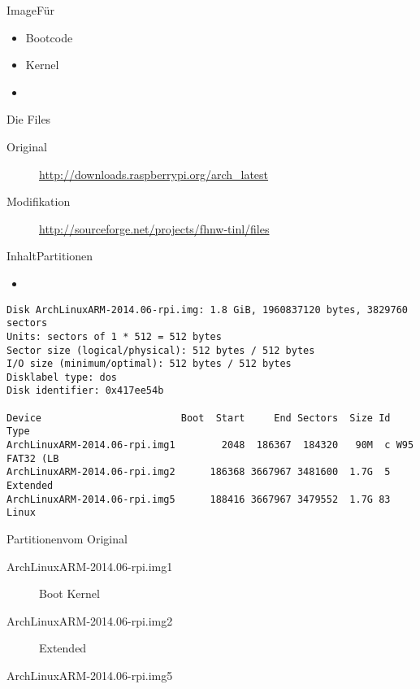 \begin{frame}{Image}{Für \target}

\begin{itemize}
 \item Bootcode
 \item Kernel
 \item \unix
\end{itemize}
\end{frame}


\begin{frame}{Die Files}
 \begin{description}
  \item[Original] 
    {\footnotesize
    \url{http://downloads.raspberrypi.org/arch_latest}
    }
  \item[Modifikation]
    {\footnotesize
    \url{http://sourceforge.net/projects/fhnw-tinl/files}
    }
 \end{description}
\end{frame}

\begin{frame}[fragile]{Inhalt}{Partitionen}
 \begin{itemize}
  \item {}
\end{itemize}
{\tiny
\begin{verbatim}
Disk ArchLinuxARM-2014.06-rpi.img: 1.8 GiB, 1960837120 bytes, 3829760 sectors
Units: sectors of 1 * 512 = 512 bytes
Sector size (logical/physical): 512 bytes / 512 bytes
I/O size (minimum/optimal): 512 bytes / 512 bytes
Disklabel type: dos
Disk identifier: 0x417ee54b

Device                        Boot  Start     End Sectors  Size Id Type
ArchLinuxARM-2014.06-rpi.img1        2048  186367  184320   90M  c W95 FAT32 (LB
ArchLinuxARM-2014.06-rpi.img2      186368 3667967 3481600  1.7G  5 Extended
ArchLinuxARM-2014.06-rpi.img5      188416 3667967 3479552  1.7G 83 Linux
\end{verbatim}
}
\end{frame}

\begin{frame}{Partitionen}{vom Original}
 \begin{description}
  \item[ArchLinuxARM-2014.06-rpi.img1] Boot Kernel
  \item[ArchLinuxARM-2014.06-rpi.img2] Extended
  \item[ArchLinuxARM-2014.06-rpi.img5] \unix 
 \end{description}
\end{frame}

